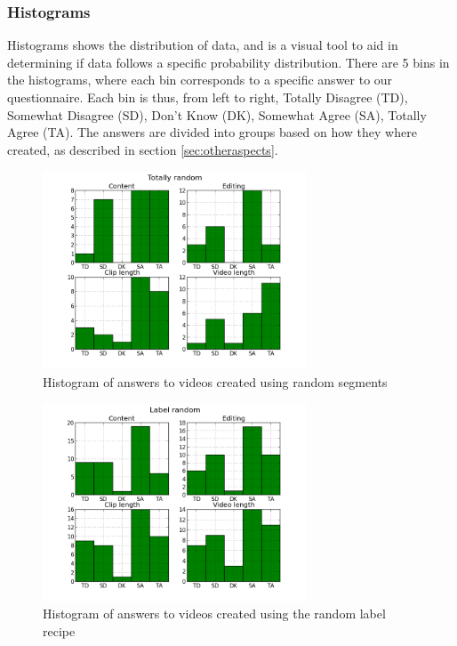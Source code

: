 \subsubsection{Histograms}\label{sec:histograms}
%
Histograms shows the distribution of data, and is a visual tool to aid in determining if data follows a specific probability distribution. There are 5 bins in the histograms, where each bin corresponds to a specific answer to our questionnaire. Each bin is thus, from left to right, Totally Disagree (TD), Somewhat Disagree (SD), Don't Know (DK), Somewhat Agree (SA), Totally Agree (TA). The answers are divided into groups based on how they where created, as described in section \ref{sec:otheraspects}.
%
\begin{figure}[!ht]
     \centering
     \includegraphics[width=0.7\textwidth]{img/totallyrandom_barplot.png}
     \caption{Histogram of answers to videos created using random segments}\label{fig:hist_random}
\end{figure}
%
\begin{figure}[!ht]
     \centering
     \includegraphics[width=0.7\textwidth]{img/labelrandom_barplot.png}
     \caption{Histogram of answers to videos created using the random label recipe}\label{fig:hist_labelrandom}
\end{figure}

